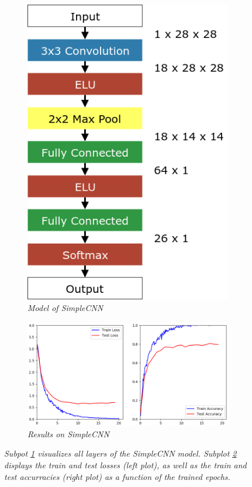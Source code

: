 \documentclass[a4paper]{article}
\begin{document}
\begin{figure}
    \centering
    \begin{subfigure}[b]{0.2\textwidth}
        \includegraphics[height=0.25\paperwidth]{graphics/nets/SimpleCNN}
        \caption{\textit{Model of SimpleCNN}}
        \label{fig:simpleCNN_model}
    \end{subfigure}
    \qquad
    \qquad
    \begin{subfigure}[b]{0.6\textwidth}
        \includegraphics[height=0.25\paperwidth]{graphics/nets/SimpleCNN_Results}
        \caption{\textit{Results on SimpleCNN}}
        \label{fig:simpleCNN_results}
    \end{subfigure}
    \caption{\textit{Subpot \ref{fig:simpleCNN_model} visualizes all layers of the SimpleCNN model. Subplot \ref{fig:simpleCNN_results} displays the train and test losses (left plot), as well as the train and test accurracies (right plot) as a function of the trained epochs.}}\label{fig:simpleCNN}
\end{figure}
\end{document}
